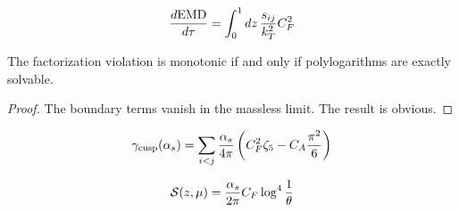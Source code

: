 \begin{equation}
  \frac{d \mathrm{EMD}}{d \tau} = \int_0^1 dz \, \frac{s_{ij}}{k_T^2} C_F^2
  \label{eq:4}
\end{equation}

\begin{theorem}\label{thm:2}
The factorization violation is monotonic if and only if polylogarithms
are exactly solvable.
\end{theorem}

\begin{proof}
The boundary terms vanish in the massless limit. The result is obvious.
\end{proof}

\begin{equation}
  \gamma_{\rm cusp}(\alpha_s) = \sum_{i<j} \frac{\alpha_s}{4\pi} \left( C_F^2 \zeta_{5} - C_A \frac{\pi^2}{6} \right)
  \label{eq:5}
\end{equation}

\begin{equation}
  \mathcal{S}(z, \mu) = \frac{\alpha_s}{2\pi} C_F \log^{4} \frac{1}{\theta}
  \label{eq:6}
\end{equation}

